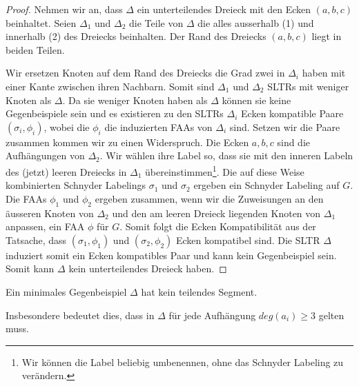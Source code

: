 \begin{proof}
Nehmen wir an, dass $\Delta$ ein unterteilendes Dreieck mit den Ecken $(a,b,c)$ beinhaltet. Seien $\Delta_1$ und $\Delta_2$ die Teile von $\Delta$ die alles ausserhalb (1) und innerhalb (2) des Dreiecks beinhalten. Der Rand des Dreiecks $(a,b,c)$ liegt in beiden Teilen.

Wir ersetzen Knoten auf dem Rand des Dreiecks die Grad zwei in $\Delta_i$ haben mit einer Kante zwischen ihren Nachbarn. Somit sind $\Delta_1$ und $\Delta_2$ SLTRs mit weniger Knoten als $\Delta$. Da sie weniger Knoten haben als $\Delta$ können sie keine Gegenbeispiele sein und es existieren zu den SLTRs $\Delta_i$ Ecken kompatible Paare $(\sigma_i,\phi_i)$, wobei die $\phi_i$ die induzierten FAAs von $\Delta_i$ sind. Setzen wir die Paare zusammen kommen wir zu einen Widerspruch. Die Ecken $a,b,c$ sind die Aufhängungen von $\Delta_2$. Wir wählen ihre Label so, dass sie mit den inneren Labeln des (jetzt) leeren Dreiecks in $\Delta_1$ übereinstimmen\footnote{Wir können die Label beliebig umbenennen, ohne das Schnyder Labeling zu verändern.}. Die auf diese Weise kombinierten Schnyder Labelings $\sigma_1$ und $\sigma_2$ ergeben ein Schnyder Labeling auf $G$. Die FAAs $\phi_1$ und $\phi_2$ ergeben zusammen, wenn wir die Zuweisungen an den äusseren Knoten von $\Delta_2$ und den am leeren Dreieck liegenden Knoten von $\Delta_1$ anpassen, ein FAA $\phi$ für $G$. Somit folgt die Ecken Kompatibilität aus der Tatsache, dass $(\sigma_1,\phi_1)$ und $(\sigma_2,\phi_2)$ Ecken kompatibel sind. Die SLTR $\Delta$ induziert somit ein Ecken kompatibles Paar und kann kein Gegenbeispiel sein. Somit kann $\Delta$ kein unterteilendes Dreieck haben.
\end{proof} 

\begin{lemma}
Ein minimales Gegenbeispiel $\Delta$ hat kein teilendes Segment.
\end{lemma}

\begin{remark}
Insbesondere bedeutet dies, dass in $\Delta$ für jede Aufhängung $deg(a_i) \geq 3$ gelten muss.
\end{remark}

